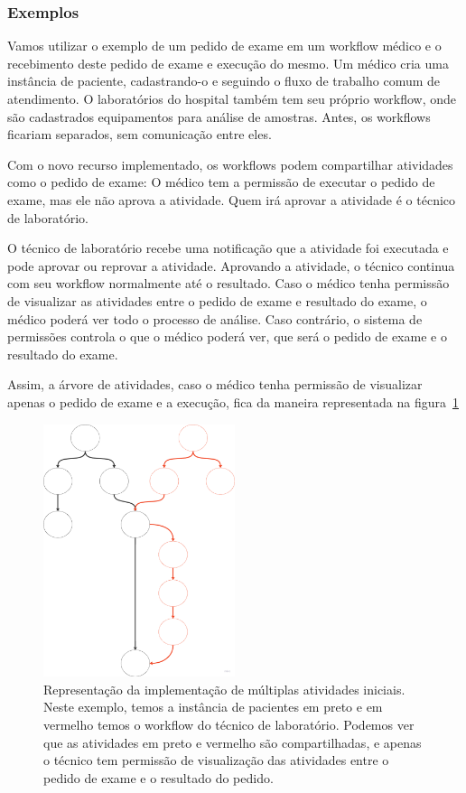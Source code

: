\subsubsection{Exemplos}

Vamos utilizar o exemplo de um pedido de exame em um workflow médico e o recebimento deste pedido de exame e execução do mesmo.
Um médico cria uma instância de paciente, cadastrando-o e seguindo o fluxo de trabalho comum de atendimento.
O laboratórios do hospital também tem seu próprio workflow, onde são cadastrados equipamentos para análise de amostras.
Antes, os workflows ficariam separados, sem comunicação entre eles.

Com o novo recurso implementado, os workflows podem compartilhar atividades como o pedido de exame: O médico tem a permissão de executar o pedido de exame, mas ele não aprova a atividade. Quem irá aprovar a atividade é o técnico de laboratório.

O técnico de laboratório recebe uma notificação que a atividade foi executada e pode aprovar ou reprovar a atividade.
Aprovando a atividade, o técnico continua com seu workflow normalmente até o resultado.
Caso o médico tenha permissão de visualizar as atividades entre o pedido de exame e resultado do exame, o médico poderá ver todo o processo de análise.
Caso contrário, o sistema de permissões controla o que o médico poderá ver, que será o pedido de exame e o resultado do exame.

Assim, a árvore de atividades, caso o médico tenha permissão de visualizar apenas o pedido de exame e a execução, fica da maneira representada na figura~\ref{fig:segunda_implementacao}

\begin{figure}
    \centering
    \includegraphics[width=0.5\textwidth]{imgs/Implementacoes/segundaImplementacao.png}
    \caption{Representação da implementação de múltiplas atividades iniciais. Neste exemplo, temos a instância de pacientes em preto e em vermelho temos o workflow do técnico de laboratório. Podemos ver que as atividades em preto e vermelho são compartilhadas, e apenas o técnico tem permissão de visualização das atividades entre o pedido de exame e o resultado do pedido.}
    \label{fig:segunda_implementacao}
\end{figure}

